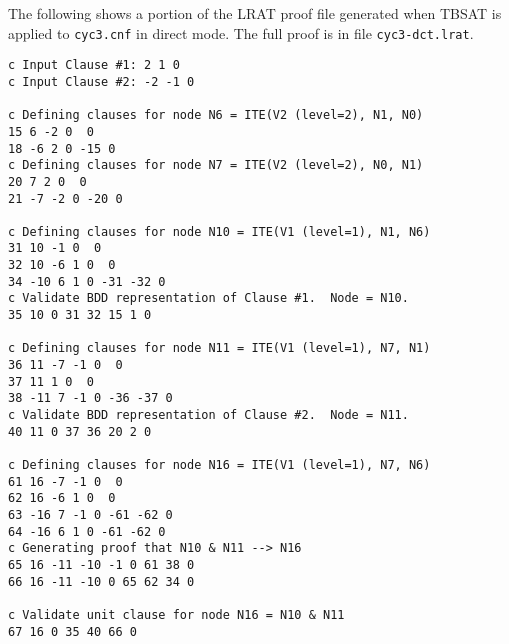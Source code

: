 \newpage
The following shows a portion of the LRAT proof file generated when TBSAT is applied to \texttt{cyc3.cnf} in direct mode.
The full proof is in file \texttt{cyc3-dct.lrat}.
\begin{lstlisting}
c Input Clause #1: 2 1 0
c Input Clause #2: -2 -1 0

c Defining clauses for node N6 = ITE(V2 (level=2), N1, N0)
15 6 -2 0  0
18 -6 2 0 -15 0
c Defining clauses for node N7 = ITE(V2 (level=2), N0, N1)
20 7 2 0  0
21 -7 -2 0 -20 0

c Defining clauses for node N10 = ITE(V1 (level=1), N1, N6)
31 10 -1 0  0
32 10 -6 1 0  0
34 -10 6 1 0 -31 -32 0
c Validate BDD representation of Clause #1.  Node = N10.
35 10 0 31 32 15 1 0

c Defining clauses for node N11 = ITE(V1 (level=1), N7, N1)
36 11 -7 -1 0  0
37 11 1 0  0
38 -11 7 -1 0 -36 -37 0
c Validate BDD representation of Clause #2.  Node = N11.
40 11 0 37 36 20 2 0

c Defining clauses for node N16 = ITE(V1 (level=1), N7, N6)
61 16 -7 -1 0  0
62 16 -6 1 0  0
63 -16 7 -1 0 -61 -62 0
64 -16 6 1 0 -61 -62 0
c Generating proof that N10 & N11 --> N16
65 16 -11 -10 -1 0 61 38 0
66 16 -11 -10 0 65 62 34 0

c Validate unit clause for node N16 = N10 & N11
67 16 0 35 40 66 0
\end{lstlisting}

\newpage

